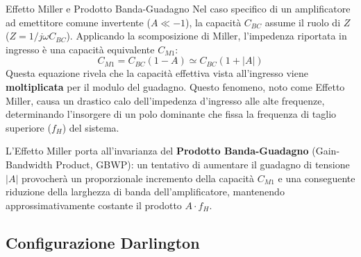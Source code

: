\begin{teorema}{Effetto Miller e Prodotto Banda-Guadagno}
    Nel caso specifico di un amplificatore ad emettitore comune invertente ($A \ll -1$), la capacità $C_{BC}$ assume il ruolo di $Z$ ($Z = 1/j\omega C_{BC}$). Applicando la scomposizione di Miller, l'impedenza riportata in ingresso è una capacità equivalente $C_{M1}$:
    \begin{equation}
        C_{M1} = C_{BC}(1 - A) \simeq C_{BC}(1 + |A|)
    \end{equation}
    Questa equazione rivela che la capacità effettiva vista all'ingresso viene \textbf{moltiplicata} per il modulo del guadagno. Questo fenomeno, noto come Effetto Miller, causa un drastico calo dell'impedenza d'ingresso alle alte frequenze, determinando l'insorgere di un polo dominante che fissa la frequenza di taglio superiore ($f_H$) del sistema.
    
    L'Effetto Miller porta all'invarianza del \textbf{Prodotto Banda-Guadagno} (Gain-Bandwidth Product, GBWP): un tentativo di aumentare il guadagno di tensione $|A|$ provocherà un proporzionale incremento della capacità $C_{M1}$ e una conseguente riduzione della larghezza di banda dell'amplificatore, mantenendo approssimativamente costante il prodotto $A \cdot f_H$.
\end{teorema}


\subsection{Configurazione Darlington}

